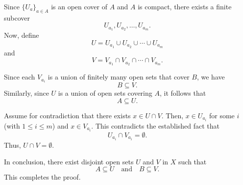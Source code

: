 \documentclass[12pt, letterpaper]{article}
\begin{document}
Since \( \{ U_a \}_{a \in A} \) is an open cover of \( A \) and \( A \) is compact, there exists a finite subcover
\[
U_{a_1}, U_{a_2}, \dots, U_{a_m}.
\]
Now, define
\[
U = U_{a_1} \cup U_{a_2} \cup \cdots \cup U_{a_m}
\]
and
\[
V = V_{a_1} \cap V_{a_2} \cap \cdots \cap V_{a_m}.
\]

Since each \( V_{a_i} \) is a union of finitely many open sets that cover \( B \), we have
\[
B \subseteq V.
\]
Similarly, since \( U \) is a union of open sets covering \( A \), it follows that
\[
A \subseteq U.
\]

Assume for contradiction that there exists \( x \in U \cap V \). Then, \( x \in U_{a_i} \) for some \( i \) (with \( 1 \le i \le m \)) and \( x \in V_{a_i} \). This contradicts the established fact that 
\[
U_{a_i} \cap V_{a_i} = \emptyset.
\]
Thus, \( U \cap V = \emptyset \).

In conclusion, there exist disjoint open sets \( U \) and \( V \) in \( X \) such that
\[
A \subseteq U \quad \text{and} \quad B \subseteq V.
\]
This completes the proof.
\end{document}
